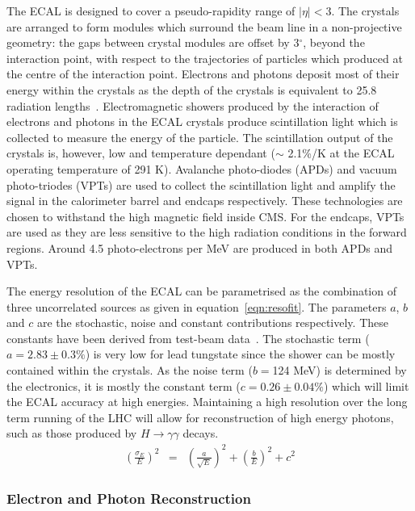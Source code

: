 The ECAL is designed to cover a pseudo-rapidity range of $|\eta | < 3$. 
The crystals are arranged to form modules which surround the beam line in a non-projective geometry:
the gaps between crystal modules are offset by 3$^{\circ}$, beyond the interaction point, with respect to 
the trajectories of particles which produced at the centre of the interaction point. 
Electrons and photons deposit most of their energy within 
the crystals as the depth of the crystals is equivalent to 25.8 radiation lengths~\citep{TDR1}. 
Electromagnetic showers produced by the interaction of electrons and photons in the ECAL crystals
produce scintillation light which is collected to measure the energy of the particle. 
The scintillation output of the crystals is, however, low and temperature dependant 
($\sim$ 2.1\%/K at the ECAL operating temperature of 291 K). 
Avalanche photo-diodes (APDs) and vacuum 
photo-triodes (VPTs) are used to collect the scintillation light and amplify the signal in the 
calorimeter barrel and endcaps respectively. 
These technologies are chosen to withstand the high magnetic field inside CMS.
For the endcaps, VPTs are used as they are less sensitive to the high radiation conditions  
in the forward regions. Around 4.5 photo-electrons per MeV are produced in both APDs and VPTs. 

The energy resolution of the ECAL can be parametrised as the combination of three 
uncorrelated sources as given in equation~\ref{eqn:resofit}.
The parameters $a$, $b$ and $c$ are the stochastic, noise and constant contributions respectively. 
These constants have been derived from test-beam data~\citep{AN-06-140}.
The stochastic term ($a=2.83\pm0.3\%$) is very low for lead tungstate since the shower 
can be mostly contained within the crystals.
As the noise term ($b=$124 MeV) is determined by the electronics, 
it is mostly the constant term ($c=0.26\pm0.04\%$) which will limit the ECAL accuracy at 
high energies. Maintaining a high resolution 
over the long term running of the LHC will allow for reconstruction of high energy photons, 
such as those produced by $H \rightarrow \gamma\gamma$ decays.
\begin{eqnarray}
\left( \frac{\displaystyle \sigma_{E}}{\displaystyle E} \right)^ 2 
	& = & \left( \frac{\displaystyle a}{\displaystyle \sqrt{E}} \right)^ 2 
  	+ \left( \frac{\displaystyle b}{\displaystyle {E}} \right)^ 2 + c^ 2
\label{eqn:resofit}
\end{eqnarray}


\subsubsection{Electron and Photon Reconstruction}


